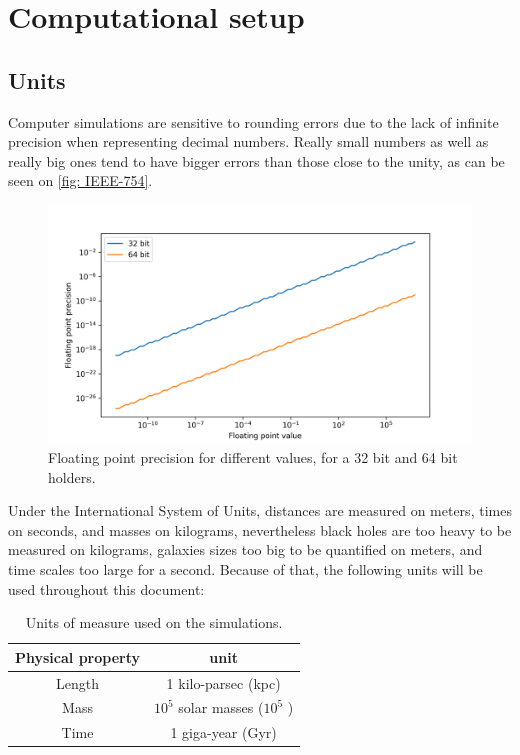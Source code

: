 
\chapter{Computational setup} %
	\section{Units}
	Computer simulations are sensitive to rounding errors due to the lack of infinite precision when representing decimal numbers. Really small numbers as well as really big ones tend to have bigger errors than those close to the unity, as can be seen on \autoref{fig: IEEE-754}.
	\begin{figure}[h]
		\centering
		\includegraphics[width=0.8\linewidth]{"../Files/Week 3/floating"}
		\caption{Floating point precision for different values, for a 32 bit and 64 bit holders.}
		\label{fig: IEEE-754}
	\end{figure}
	
	Under the International System of Units, distances are measured on meters, times on seconds, and masses on kilograms, nevertheless black holes are too heavy to be measured on kilograms, galaxies sizes too big to be quantified on meters, and time scales too large for a second. Because of that, the following units will be used throughout this document:
	\begin{table}[h]
		\centering
		\caption{Units of measure used on the simulations.}
		\label{tb: units}
		\begin{tabular}{c|c}
			\hline
			\textbf{Physical property} & \textbf{unit} \\
			\hline
			Length & 1 kilo-parsec (kpc) \\
			Mass & $10^5$ solar masses ($10^5$ \sm) \\
			Time & 1 giga-year (Gyr) \\
			\hline
		\end{tabular}
	\end{table}
	
